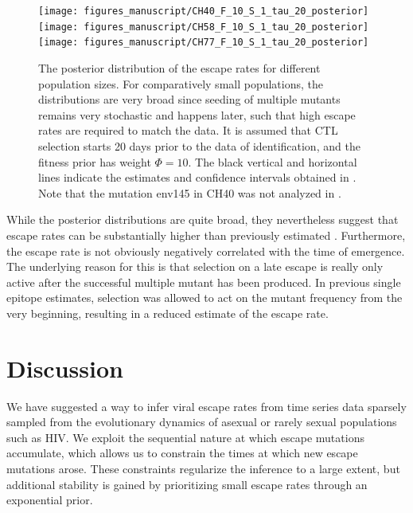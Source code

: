 \documentclass{frontiers}
\newcommand{\fitprior}{\Phi}
\begin{document}
\begin{figure}[htp]
\begin{center}
  \texttt{[image: figures\_manuscript/CH40\_F\_10\_S\_1\_tau\_20\_posterior]}
  \texttt{[image: figures\_manuscript/CH58\_F\_10\_S\_1\_tau\_20\_posterior]}
  \texttt{[image: figures\_manuscript/CH77\_F\_10\_S\_1\_tau\_20\_posterior]}
  \caption[labelInTOC]{The posterior distribution of the escape rates for
  different population sizes. For comparatively small populations, the
  distributions are very broad since seeding of multiple mutants remains very
  stochastic and happens later, such that high escape rates are
  required to match the data. It is assumed that CTL selection starts 20 days
  prior to the data of identification, and the fitness prior has weight
  $\fitprior=10$. The black vertical and horizontal lines indicate the
  estimates and confidence intervals obtained in
  \citet{ganusov_fitness_2011}. Note that the mutation env145 in
  CH40 was not analyzed in \citet{ganusov_fitness_2011}. }
  \label{fig:patients}
\end{center}
\end{figure}


While the posterior distributions are quite broad, they nevertheless suggest
that escape rates can be substantially higher than previously
estimated \citep{ganusov_fitness_2011,Asquith:2006p28003}.
Furthermore, the escape rate is not obviously negatively correlated with the
time of emergence.
The underlying reason for this is that selection on a late escape is really only active after the
successful multiple mutant has been produced. In previous single epitope
estimates, selection was allowed to act on the mutant frequency from the very
beginning, resulting in a reduced estimate of the escape rate. 

\section{Discussion}
We have suggested a way to infer viral escape rates from time series data sparsely sampled
from the evolutionary dynamics of asexual or rarely sexual populations such as
HIV. We exploit the sequential nature at which escape mutations accumulate, which
allows us to constrain the times at which new escape mutations arose. These
constraints regularize the inference to a large extent, but additional stability
is gained by prioritizing small escape rates through an
exponential prior.
\end{document}
